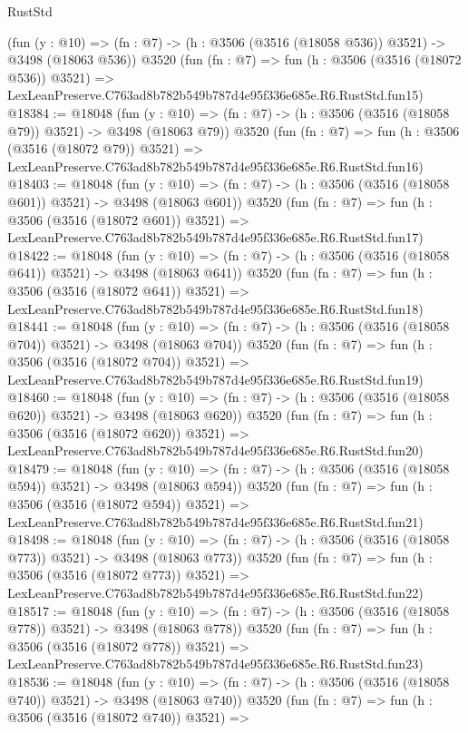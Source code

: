 \begin{lexlean}{RustStd}
\begin{coremodule}
    (fun (y : @10) => (fn : @7) -> (h : @3506 (@3516 (@18058 @536)) @3521) -> @3498 (@18063 @536))
    @3520
    (fun (fn : @7) =>
    fun (h : @3506 (@3516 (@18072 @536)) @3521) =>
    LexLeanPreserve.C763ad8b782b549b787d4e95f336e685e.R6.RustStd.fun15)
@18384 := @18048
    (fun (y : @10) => (fn : @7) -> (h : @3506 (@3516 (@18058 @79)) @3521) -> @3498 (@18063 @79))
    @3520
    (fun (fn : @7) =>
    fun (h : @3506 (@3516 (@18072 @79)) @3521) =>
    LexLeanPreserve.C763ad8b782b549b787d4e95f336e685e.R6.RustStd.fun16)
@18403 := @18048
    (fun (y : @10) => (fn : @7) -> (h : @3506 (@3516 (@18058 @601)) @3521) -> @3498 (@18063 @601))
    @3520
    (fun (fn : @7) =>
    fun (h : @3506 (@3516 (@18072 @601)) @3521) =>
    LexLeanPreserve.C763ad8b782b549b787d4e95f336e685e.R6.RustStd.fun17)
@18422 := @18048
    (fun (y : @10) => (fn : @7) -> (h : @3506 (@3516 (@18058 @641)) @3521) -> @3498 (@18063 @641))
    @3520
    (fun (fn : @7) =>
    fun (h : @3506 (@3516 (@18072 @641)) @3521) =>
    LexLeanPreserve.C763ad8b782b549b787d4e95f336e685e.R6.RustStd.fun18)
@18441 := @18048
    (fun (y : @10) => (fn : @7) -> (h : @3506 (@3516 (@18058 @704)) @3521) -> @3498 (@18063 @704))
    @3520
    (fun (fn : @7) =>
    fun (h : @3506 (@3516 (@18072 @704)) @3521) =>
    LexLeanPreserve.C763ad8b782b549b787d4e95f336e685e.R6.RustStd.fun19)
@18460 := @18048
    (fun (y : @10) => (fn : @7) -> (h : @3506 (@3516 (@18058 @620)) @3521) -> @3498 (@18063 @620))
    @3520
    (fun (fn : @7) =>
    fun (h : @3506 (@3516 (@18072 @620)) @3521) =>
    LexLeanPreserve.C763ad8b782b549b787d4e95f336e685e.R6.RustStd.fun20)
@18479 := @18048
    (fun (y : @10) => (fn : @7) -> (h : @3506 (@3516 (@18058 @594)) @3521) -> @3498 (@18063 @594))
    @3520
    (fun (fn : @7) =>
    fun (h : @3506 (@3516 (@18072 @594)) @3521) =>
    LexLeanPreserve.C763ad8b782b549b787d4e95f336e685e.R6.RustStd.fun21)
@18498 := @18048
    (fun (y : @10) => (fn : @7) -> (h : @3506 (@3516 (@18058 @773)) @3521) -> @3498 (@18063 @773))
    @3520
    (fun (fn : @7) =>
    fun (h : @3506 (@3516 (@18072 @773)) @3521) =>
    LexLeanPreserve.C763ad8b782b549b787d4e95f336e685e.R6.RustStd.fun22)
@18517 := @18048
    (fun (y : @10) => (fn : @7) -> (h : @3506 (@3516 (@18058 @778)) @3521) -> @3498 (@18063 @778))
    @3520
    (fun (fn : @7) =>
    fun (h : @3506 (@3516 (@18072 @778)) @3521) =>
    LexLeanPreserve.C763ad8b782b549b787d4e95f336e685e.R6.RustStd.fun23)
@18536 := @18048
    (fun (y : @10) => (fn : @7) -> (h : @3506 (@3516 (@18058 @740)) @3521) -> @3498 (@18063 @740))
    @3520
    (fun (fn : @7) =>
    fun (h : @3506 (@3516 (@18072 @740)) @3521) =>

\end{coremodule}
\end{lexlean}
